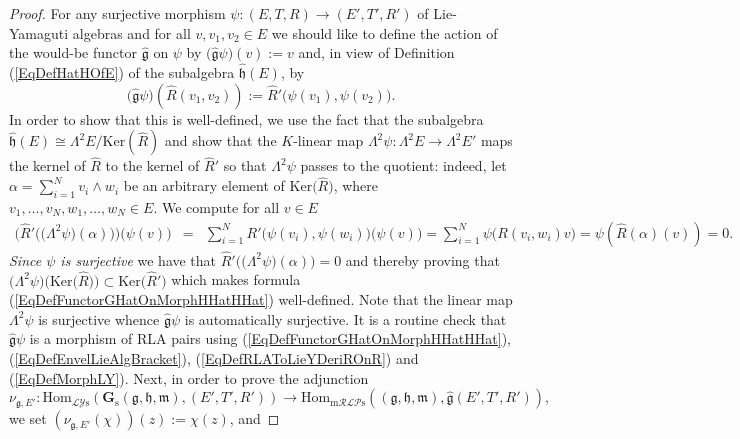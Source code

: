 \documentclass [11pt] {article}
\theoremstyle{definition}
\begin{document}
\begin{proof}
	For any surjective morphism $\psi:(E,T,R)\to (E',T',R')$ of Lie-Yamaguti algebras and for all $v,v_1,v_2\in E$
	we should like to define the action of the would-be functor $\hat{\mathfrak{g}}$ on $\psi$ by $\big(\hat{\mathfrak{g}}\psi\big)(v):=v$
	and, in view of Definition (\ref{EqDefHatHOfE}) of the subalgebra
	$\hat{\mathfrak{h}}(E)$, by
	\begin{equation}\label{EqDefFunctorGHatOnMorphHHatHHat}
	    \big(\hat{\mathfrak{g}}\psi\big)\left(\hat{R}(v_1,v_2)\right):=
	       \hat{R}'\big(\psi(v_1),\psi(v_2)\big).
	\end{equation}
	In order to show that this is well-defined, we use the fact that the subalgebra $\hat{\mathfrak{h}}(E)\cong \Lambda^2E/\mathrm{Ker}(\hat{R})$ 
	and show that the $K$-linear map $\Lambda^2\psi:\Lambda^2E\to\Lambda^2E'$
	maps the kernel of $\hat{R}$ to the kernel of $\hat{R}'$ so that
	$\Lambda^2\psi$ passes to the quotient: indeed, let
	$\alpha=\sum_{i=1}^Nv_i\wedge w_i$ be an arbitrary element of 
	$\mathrm{Ker}\big(\hat{R}\big)$, where $v_1,\ldots,v_N,w_1,\ldots,w_N\in E$. We compute for all $v\in E$
	\begin{eqnarray*}
	  \Big(\hat{R}'\big(\big(\Lambda^2\psi\big)(\alpha)\big)\Big)\big(\psi(v)\big) & = &
	     	\sum_{i=1}^NR'\big(\psi(v_i),\psi(w_i)\big)\big(\psi(v)\big)
	     	=
	     	\sum_{i=1}^N\psi\big(R(v_i,w_i)v\big)
	   =  \psi\left(\hat{R}(\alpha)(v)\right)
	  = 0.
	\end{eqnarray*}
	\textit{Since $\psi$ is surjective} we have that $\hat{R}'\big(\big(\Lambda^2\psi\big)(\alpha)\big)=0$ and thereby proving that
	$\big(\Lambda^2\psi\big)\big(\mathrm{Ker}\big(\hat{R}\big)\big)\subset \mathrm{Ker}\big(\hat{R}'\big)$ which makes
	formula (\ref{EqDefFunctorGHatOnMorphHHatHHat}) well-defined. Note that
	the linear map $\Lambda^2\psi$ is surjective whence $\hat{\mathfrak{g}}\psi$ is automatically surjective. It is a routine check that $\hat{\mathfrak{g}}\psi$ is a morphism of RLA pairs using 
	(\ref{EqDefFunctorGHatOnMorphHHatHHat}), (\ref{EqDefEnvelLieAlgBracket}), (\ref{EqDefRLAToLieYDeriROnR}) and (\ref{EqDefMorphLY}). Next, in order to prove the adjunction
	\[
	   \nu_{\mathfrak{g},E'}:
	   \mathrm{Hom}_{\mathcal{LY}\mathrm{s}}
	   \left(\mathbf{G}_\mathrm{s}(\mathfrak{g},\mathfrak{h},\mathfrak{m}),
	           (E',T',R')\right)
	           \to
	     \mathrm{Hom}_{\mathrm{m}\mathcal{RLP}\mathrm{s}}  
	     \left((\mathfrak{g},\mathfrak{h},\mathfrak{m}),
	          \hat{\mathfrak{g}}(E',T',R')\right),
	\]
	we set $(\nu_{\mathfrak{g},E'}(\chi))(z):=\chi(z)$, and 

\end{proof}
\end{document}
